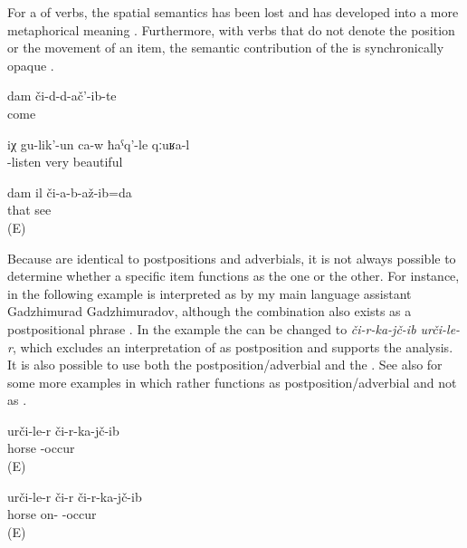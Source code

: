 For a  of verbs, the spatial semantics has been lost and has developed into a more metaphorical meaning . Furthermore, with verbs that do not denote the position or the movement of an item, the semantic contribution of the  is synchronically opaque \xxref{ex:He is listening carefully to him verbs@3}{ex:I did not see it. [There is no lock}.
%
\begin{exe}
	\ex	\label{ex:(It is enough what) I experienced verbs@2}
	\gll	dam	či-d-d-ač'-ib-te\\
			come\\
	\glt	{}

	\ex	\label{ex:He is listening carefully to him verbs@3}
	\gll	iχ	gu-lik'-un	ca-w	ħaˁq'-le	qːuʁa-l\\
			-listen		very	beautiful\\
	\glt	{}

	\ex	\label{ex:I did not see it. [There is no lock}
	\gll	dam	il	či-a-b-až-ib=da\\
			that	see\\
	\glt	{} (E)
\end{exe}

Because  are identical to postpositions and adverbials, it is not always possible to determine whether a specific item functions as the one or the other. For instance,  in the following example  is interpreted as  by my main language assistant Gadzhimurad Gadzhimuradov, although the combination  also exists as a postpositional phrase . In the example  the  can be changed to \textit{či-r-ka-jč-ib urči-le-r}, which excludes an interpretation of  as postposition and supports the  analysis. It is also possible to use both the postposition/adverbial and the  . See also  for some more examples in which  rather functions as postposition/adverbial and not as .
%
\begin{exe}
	\ex	\label{ex:He fell from the horse verbs}
	\gll	urči-le-r	či-r-ka-jč-ib\\
		horse	-occur\\
	\glt	{} (E)
	
		\ex	\label{ex:He fell from the horse verbs_1}
	\gll	urči-le-r či-r	či-r-ka-jč-ib\\
		horse on- -occur\\
	\glt	{} (E)
	
\end{exe}

